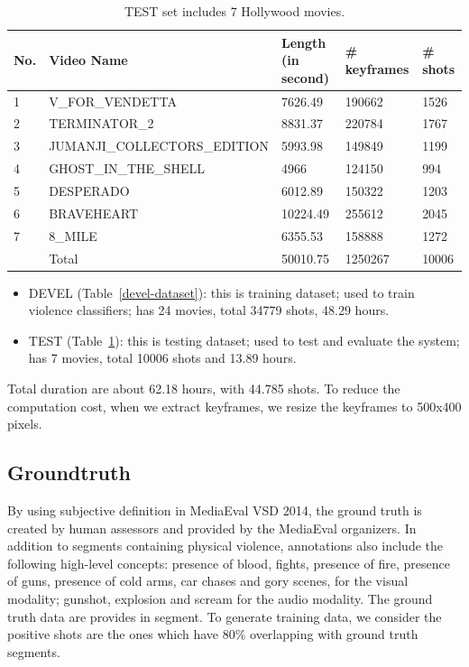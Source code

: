 \documentclass[review]{elsarticle}
\begin{document}
\begin{table}[!t]
\begin{tabular}{ |p{} | p{} | p{} | p{} | p{} | }
	\hline
	No. & Video Name & Length (in second) & \# keyframes & \# shots \\ \hline
	1 & V\_FOR\_VENDETTA & 7626.49 & 190662 & 1526 \\ \hline
	2 & TERMINATOR\_2 & 8831.37 & 220784 & 1767 \\ \hline
	3 & JUMANJI\_COLLECTORS\_EDITION & 5993.98 & 149849 & 1199 \\ \hline
	4 & GHOST\_IN\_THE\_SHELL & 4966 & 124150 & 994 \\ \hline
	5 & DESPERADO & 6012.89 & 150322 & 1203 \\ \hline
	6 & BRAVEHEART & 10224.49 & 255612 & 2045 \\ \hline
	7 & 8\_MILE & 6355.53 & 158888 & 1272 \\ \hline
	  & Total & 50010.75 & 1250267 & 10006 \\ \hline
\end{tabular}
\caption{TEST set includes 7 Hollywood movies.}
\label{test-dataset}
\end{table}

\begin{itemize}
	\item DEVEL (Table~\ref{devel-dataset}): this is training dataset; used to train violence classifiers; has 24 movies, total 34779 shots, 48.29 hours. 
	\item TEST (Table~\ref{test-dataset}): this is testing dataset; used to test and evaluate the system; has 7 movies, total 10006 shots and 13.89 hours.
\end{itemize}
Total duration are about 62.18 hours, with 44.785 shots. To reduce the computation cost, when we extract keyframes, we resize the keyframes to 500x400 pixels.
\subsection{Groundtruth}
By using subjective definition in MediaEval VSD 2014\cite{demarty2014benchmarking}, the ground truth is created by human assessors and provided by the MediaEval organizers. In addition to segments containing physical violence, annotations also include the following high-level concepts: presence of blood, fights, presence of fire, presence of guns, presence of cold arms, car chases and gory scenes, for the visual modality; gunshot, explosion and scream for the audio modality. The ground truth data are provides in segment. To generate training data, we consider the positive shots are the ones which have 80\% overlapping with ground truth segments.
\end{document}
